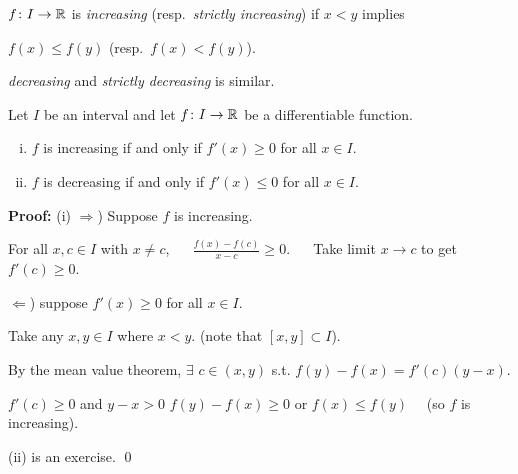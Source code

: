 \documentclass[10pt,aspectratio=149]{beamer}
\begin{document}
\begin{frame}
$f \colon I \to {\mathbb{R}}$ is \emph{increasing}
(resp.\  \emph{strictly increasing}) if
$x < y$ implies

$f(x) \leq f(y)$ (resp.\ $f(x) < f(y)$).

\pause
\emph{decreasing} and
\emph{strictly decreasing} is similar.

\pause
\begin{proposition}
Let $I$ be an interval and
let $f \colon I \to {\mathbb{R}}$ be a differentiable function.
\begin{enumerate}[(i)]
\item
\pause
$f$ is increasing if and only if $f'(x) \geq 0$ for all $x \in I$.
\item
\pause
$f$ is decreasing if and only if $f'(x) \leq 0$ for all $x \in I$.
\end{enumerate}
\end{proposition}

\pause
\textbf{Proof:}
(i) $\Rightarrow$) Suppose $f$ is increasing.

\pause
\medskip

For all $x,c \in I$ with $x \neq c$, ~~
$\displaystyle
\frac{f(x)-f(c)}{x-c} \geq 0$.
\pause
~~
Take limit $x \to c$ to get $f'(c) \geq 0$.

\pause
\medskip

$\Leftarrow$) suppose $f'(x) \geq 0$ for all $x \in I$.

\pause
Take any $x, y \in I$ where $x < y$.  (note that $[x,y] \subset I$).

\pause
\medskip

By the mean value theorem, $\exists$ $c \in (x,y)$ s.t.
$\displaystyle
f(y)-f(x) = f'(c)(y-x)$.

\pause
\medskip

$f'(c) \geq 0$ and $y-x > 0$ \wthus $f(y) - f(x) \geq 0$ or $f(x) \leq
f(y)$
\pause
~~(so $f$ is increasing).

\pause
\medskip

(ii) is an exercise.
\qed

\end{frame}
\end{document}
